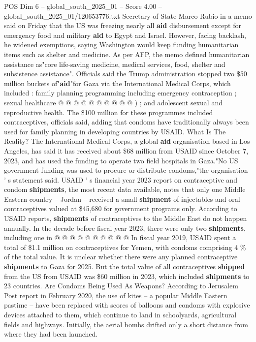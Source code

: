 \begin{textsample}{POS Dim 6 – global\_south\_2025\_01 – Score 4.00 – global\_south\_2025\_01/120653776.txt}
Secretary of State Marco Rubio in a memo said on Friday that the US was freezing nearly all \textbf{aid} disbursement except for emergency food and military \textbf{aid} to Egypt and Israel.
However, facing backlash, he widened exemptions, saying Washington would keep funding humanitarian items such as shelter and medicine.
As per AFP, the memo defined humanitarian assistance as"core life-saving medicine, medical services, food, shelter and subsistence assistance".
Officials said the Trump administration stopped two \$50 million buckets of"\textbf{aid}"for Gaza via the International Medical Corps, which included : family planning programming including emergency contraception ; sexual healthcare @ @ @ @ @ @ @ @ @ @ ) ; and adolescent sexual and reproductive health.
The \$100 million for these programmes included contraceptives, officials said, adding that condoms have traditionally always been used for family planning in developing countries by USAID.
What Is The Reality?
The International Medical Corps, a global \textbf{aid} organisation based in Los Angeles, has said it has received about \$68 million from USAID since October 7, 2023, and has used the funding to operate two field hospitals in Gaza."No US government funding was used to procure or distribute condoms,"the organisation ' s statement said.
USAID ' s financial year 2023 report on contraceptive and condom \textbf{shipments}, the most recent data available, notes that only one Middle Eastern country -- Jordan -- received a small \textbf{shipment} of injectables and oral contraceptives valued at \$45,680 for government programs only.
According to USAID reports, \textbf{shipments} of contraceptives to the Middle East do not happen annually.
In the decade before fiscal year 2023, there were only two \textbf{shipments}, including one in @ @ @ @ @ @ @ @ @ @ In fiscal year 2019, USAID spent a total of \$1.1 million on contraceptives for Yemen, with condoms comprising 4 \% of the total value.
It is unclear whether there were any planned contraceptive \textbf{shipments} to Gaza for 2025.
But the total value of all contraceptives \textbf{shipped} from the US from USAID was \$60 million in 2023, which included \textbf{shipments} to 23 countries.
Are Condoms Being Used As Weapons?
According to Jerusalem Post report in February 2020, the use of kites -- a popular Middle Eastern pastime -- have been replaced with scores of balloons and condoms with explosive devices attached to them, which continue to land in schoolyards, agricultural fields and highways.
Initially, the aerial bombs drifted only a short distance from where they had been launched.

\end{textsample}
